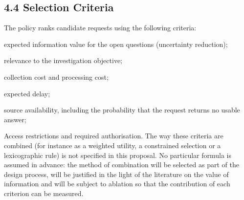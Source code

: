 \documentclass[a4paper,11pt]{article}
\begin{document}
\subsection{4.4 Selection Criteria}
The policy ranks candidate requests using the following criteria:\par
expected information value for the open questions (uncertainty reduction);\par
relevance to the investigation objective;\par
collection cost and processing cost;\par
expected delay;\par
source availability, including the probability that the request returns no usable answer;\par
Access restrictions and required authorisation. The way these criteria are combined (for instance as a weighted utility, a constrained selection or a lexicographic rule) is not specified in this proposal. No particular formula is assumed in advance: the method of combination will be selected as part of the design process, will be justified in the light of the literature on the value of information and will be subject to ablation so that the contribution of each criterion can be measured.\par
\end{document}
